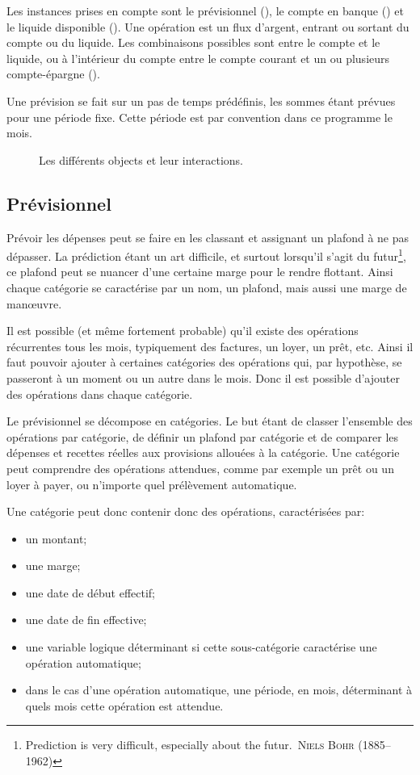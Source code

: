 Les instances prises en compte sont le prévisionnel
(\forecast), le compte en banque (\bank) et le 
liquide disponible (\liquid). Une opération est un flux d'argent, 
entrant ou sortant du compte ou du liquide. Les combinaisons possibles 
sont entre le compte et le liquide, ou à l'intérieur du compte entre le 
compte courant et un ou plusieurs compte-épargne (\saving).

Une prévision se fait sur un pas de temps prédéfinis, les sommes
étant prévues pour une période fixe. Cette période est par convention
dans ce programme le mois.

\begin{figure}
\centering
{}
\caption{\label{compta:entites}Les différents objects et leur interactions.}
\end{figure}

\subsection{Prévisionnel}

Prévoir les dépenses peut se faire en les classant et assignant
un plafond à ne pas dépasser. La prédiction étant un art difficile,
et surtout lorsqu'il s'agit du futur\footnote{\og Prediction is very
difficult, especially about the futur.\fg\ \textsc{Niels Bohr}
(1885--1962)}, ce plafond peut se nuancer d'une certaine marge
pour le rendre flottant.
Ainsi chaque catégorie se caractérise par un nom, un plafond, mais
aussi une marge de man\oe uvre.

Il est possible (et même fortement probable) qu'il existe des
opérations récurrentes tous les mois, typiquement des factures, 
un loyer, un prêt, etc. Ainsi il faut pouvoir ajouter
à certaines catégories des opérations qui, par hypothèse,
se passeront à un moment ou un autre dans le mois.
Donc il est possible d'ajouter des opérations dans chaque
catégorie.

Le prévisionnel se décompose en catégories. Le but étant de classer 
l'ensemble des opérations par catégorie, de définir un plafond par 
catégorie et de comparer les dépenses et recettes réelles aux 
provisions allouées à la catégorie. Une catégorie peut comprendre 
des opérations attendues, comme par exemple un prêt ou un loyer à 
payer, ou n'importe quel prélèvement automatique.

Une catégorie peut donc contenir donc des opérations, caractérisées
par:
\begin{itemize}
\item un montant;
\item une marge;
\item une date de début effectif;
\item une date de fin effective;
\item une variable logique déterminant si cette sous-catégorie
        caractérise une opération automatique;
\item dans le cas d'une opération automatique, une période, en mois,
        déterminant à quels mois cette opération est attendue.
\end{itemize}

